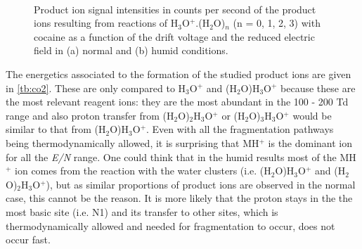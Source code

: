  
\begin{figure}[htbp]
\centering
{}\\
\caption{Product ion signal intensities in counts per second of the product ions resulting from reactions of  H$_3$O$^+$.(H$_2$O)$_n$ (n = 0, 1, 2, 3) with cocaine as a function of the drift voltage and the reduced electric field in (a) normal and (b) humid conditions.}
\label{fig:cocaineEN}
\end{figure}

The energetics associated to the formation of the studied product ions are given in \autoref{tb:co2}. 
%
These are only compared to H$_3$O$^+$ and (H$_2$O)H$_3$O$^+$ because these are the most relevant reagent ions: they are the most abundant in the 100 - 200 Td range and also proton transfer from (H$_2$O)$_2$H$_3$O$^+$ or (H$_2$O)$_3$H$_3$O$^+$ would be similar to that from (H$_2$O)H$_3$O$^+$.
%
Even with all the fragmentation pathways being thermodynamically allowed, it is surprising that MH$^+$ is the dominant ion for all the \textit{E/N} range.
%
One could think that in the humid results most of the MH$^+$ ion comes from the reaction with the water clusters (i.e. (H$_2$O)H$_3$O$^+$ and (H$_2$O)$_2$H$_3$O$^+$), but as similar proportions of product ions are observed in the normal case, this cannot be the reason.
%
It is more likely that the proton stays in the the most basic site (i.e. N1) and its transfer to other sites, which is thermodynamically allowed and needed for fragmentation to occur, does not occur fast.
%
%



